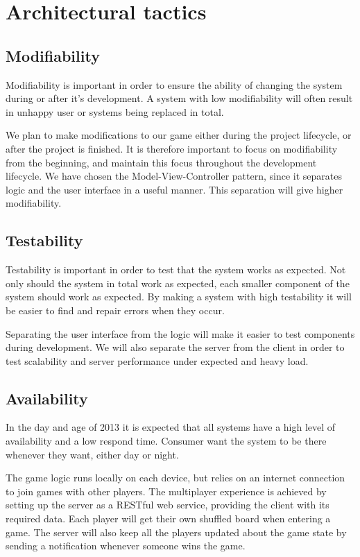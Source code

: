 \section{Architectural tactics}
\label{sec:architecturaltactics}

\subsection{Modifiability} 
Modifiability is important in order to ensure the ability of changing the system during or after it's development. A system with low modifiability will often result in unhappy user or systems being replaced in total. 

We plan to make modifications to our game either during the project lifecycle, or after the project is finished. It is therefore important to focus on modifiability from the beginning, and maintain this focus throughout the development lifecycle. We have chosen the Model-View-Controller pattern, since it separates logic and the user interface in a useful manner. This separation
will give higher modifiability.

\subsection{Testability}
Testability is important in order to test that the system works as expected. Not only should the system in total work as expected, each smaller component of the system should work as expected. By making a system with high testability it will be easier to find and repair errors when they occur.

Separating the user interface from the logic will make it easier to test components during development. We will also separate the server from the client in order to test scalability and server performance under expected and heavy load.

\subsection{Availability} 
In the day and age of 2013 it is expected that all systems have a high level of availability and a low respond time. Consumer want the system to be there whenever they want, either day or night. 

The game logic runs locally on each device, but relies on an internet connection to join games with other players. The multiplayer experience is achieved by setting up the server as a RESTful web service, providing the client with its required data. Each player will get their own shuffled board when entering a game. The server will also keep all the players updated about the game state by sending a notification whenever someone wins the game.

